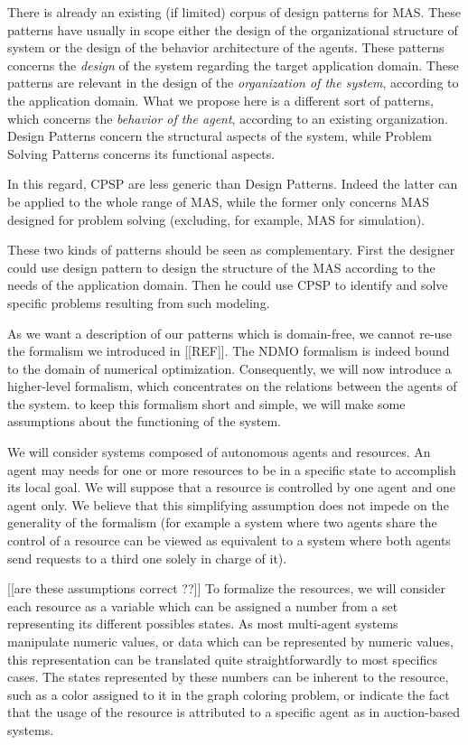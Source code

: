 There is already an existing (if limited) corpus of design patterns for MAS. These patterns have usually in scope either the design of the organizational structure of system or the design of the behavior architecture of the agents. These patterns concerns the \emph{design} of the system regarding the target application domain. These patterns are relevant in the design of the \emph{organization of the system}, according to the application domain.
What we propose here is a different sort of patterns, which concerns the \emph{behavior of the agent}, according to an existing organization. Design Patterns concern the structural aspects of the system, while Problem Solving Patterns concerns its functional aspects.

In this regard, CPSP are less generic than Design Patterns. Indeed the latter can be applied to the whole range of MAS, while the former only concerns MAS designed for problem solving (excluding, for example, MAS for simulation).

These two kinds of patterns should be seen as complementary. First the designer could use design pattern to design the structure of the MAS according to the needs of the application domain. Then he could use CPSP to identify and solve specific problems resulting from such modeling.

As we want a description of our patterns which is domain-free, we cannot re-use the formalism we introduced in [[REF]]. The NDMO formalism is indeed bound to the domain of numerical optimization.
Consequently, we will now introduce a higher-level formalism, which concentrates on the relations between the agents of the system. to keep this formalism short and simple, we will make some assumptions about the functioning of the system.

We will consider systems composed of autonomous agents and resources. An agent may needs for one or more resources to be in a specific state to accomplish its local goal. We will suppose that a resource is controlled by one agent and one agent only. We believe that this simplifying assumption does not impede on the generality of the formalism (for example a system where two agents share the control of a resource can be viewed as equivalent to a system where both agents send requests to a third one solely in charge of it).

[[are these assumptions correct ??]]
To formalize the resources, we will consider each resource as a variable which can be assigned a number from a set representing its different possibles states. As most multi-agent systems manipulate numeric values, or data which can be represented by numeric values, this representation can be translated quite straightforwardly to most specifics cases.
The states represented by these numbers can be inherent to the resource, such as a color assigned to it in the graph coloring problem, or indicate the fact that the usage of the resource is attributed to a specific agent as in auction-based systems.

